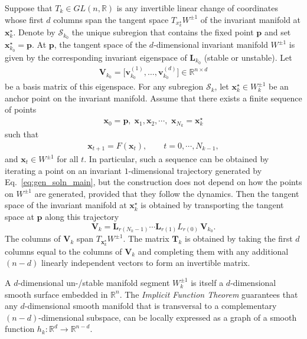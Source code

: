 \documentclass{article}
\theoremstyle{example}
\theoremstyle{plain}
\theoremstyle{definition}
\theoremstyle{remark}
\def\eqref#1{equation~\ref{#1}}
\def\vp{{\bm{p}}}
\def\vv{{\bm{v}}}
\def\vx{{\bm{x}}}
\def\mL{{\bm{L}}}
\def\mT{{\bm{T}}}
\def\mV{{\bm{V}}}
\renewcommand{\eqref}[1]{Eq.~\ref{#1}}
\begin{document}
Suppose that $T_k\in GL(n,\mathbb R)$ is any invertible linear change of coordinates whose first $d$ columns span the tangent space
$T_{x_k^\star} W^{\pm1}$ of the invariant manifold at $\vx_k^\star$. %
Denote by $\mathcal S_{k_0}$ the unique subregion that contains  
 the fixed point $\vp$ and 
set $\vx_{k_0}^\star=\vp$. At $\vp$, the tangent space of the $d$-dimensional invariant manifold $W^{\pm1}$ is given by the corresponding invariant eigenspace of $\mL_{k_0}$ (stable or unstable). Let
\begin{align}
\mV_{k_0}=\bigl[\vv^{(1)}_{k_0},\ldots,\vv^{(d)}_{k_0}\bigr]\in\mathbb R^{n\times d}
\end{align}
be a basis matrix of this eigenspace. For any subregion $\mathcal S_k$, let $\vx_k^\star\in W^{\pm1}_k$ be an anchor point on the invariant manifold. Assume that there exists a finite sequence of points
\begin{align}
\vx_0=\vp,\; \vx_1, \vx_2, \cdots, \, \, \vx_{N_k} = \vx_k^\star
\end{align}
such that
\begin{align}
\vx_{t+1}=F(\vx_t), \qquad t=0,\cdots,N_{k-1} ,
\end{align}
and $\vx_t\in W^{\pm1}$ for all $t$. In particular, such a sequence can be obtained by iterating a point on an invariant $1$-dimensional trajectory generated by \eqref{eq:gen_soln_main}, but the construction does not depend on how the points on $W^{\pm1}$ are generated, provided that they follow the dynamics. Then the tangent space of the invariant manifold at $\vx_k^\star$ is obtained by transporting the tangent space at $\vp$ along this trajectory
\begin{equation}
\mV_k
=
\mL_{r(N_k-1)}\cdots \mL_{r(1)}L_{r(0)}\,\mV_{k_0}.
\label{eq:Tk-construction}
\end{equation}
The columns of $\mV_k$ span $T_{\vx_k^\star} W^{\pm1}$. The matrix $\mT_k$ is obtained by taking the first $d$ columns equal to the columns of $\mV_k$ and completing them with any additional $(n-d)$ linearly independent vectors to form an invertible matrix.

A $d$-dimensional un-/stable manifold segment $W^{\pm1}_k$ is itself a $d$-dimensional smooth surface embedded in $\mathbb{R}^n$. The \emph{Implicit Function Theorem} guarantees that any $d$-dimensional smooth manifold that is transversal to a complementary $(n-d)$-dimensional subspace, can be locally expressed as a graph of a smooth function $h_k:\mathbb{R}^d\to\mathbb{R}^{n-d}$.
\end{document}
